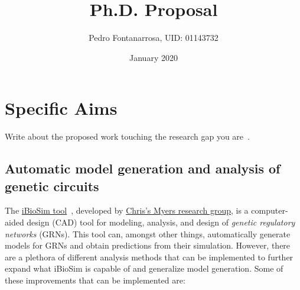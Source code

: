 \documentclass[12pt]{article}
\title{Ph.D. Proposal}
\author{Pedro Fontanarrosa, UID: 01143732}
\date{January 2020}
\begin{document}
\maketitle
\section*{Specific Aims}
Write about the proposed work touching the research gap you are~\cite{nielsen_GeneticCircuitDesign_2016}.

\subsection{Automatic model generation and analysis of genetic circuits} \label{analysis}

The \href{https://github.com/MyersResearchGroup/iBioSim}{iBioSim tool}~\cite{watanabe_IBioSimToolModelbased_2018}, developed by \href{https://async.ece.utah.edu/tools/ibiosim/}{Chris's Myers research group}, is a computer-aided design (CAD) tool for modeling, analysis, and design of \emph{genetic regulatory networks} (GRNs). This tool can, amongst other things, automatically generate models for GRNs and obtain predictions from their simulation. However, there are a plethora of different analysis methods that can be implemented to further expand what iBioSim is capable of and generalize model generation. Some of these improvements that can be implemented are:
\end{document}
